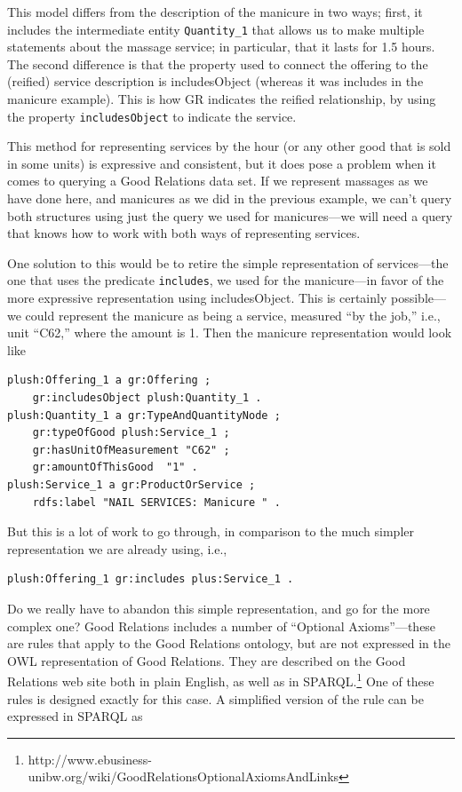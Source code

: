 This model differs from the description of the manicure in two ways;
first, it includes the intermediate entity \texttt{Quantity\_1} that allows us
to make multiple statements about the massage service; in particular,
that it lasts for 1.5 hours. The second difference is that the property
used to connect the offering to the (reified) service description is
includesObject (whereas it was includes in the manicure example). This
is how GR indicates the reified relationship, by using the property
\texttt{includesObject} to indicate the service.

This method for representing services by the hour (or any other good
that is sold in some units) is
expressive and consistent, but it does pose a problem when it comes to
querying a Good Relations data
set. If we represent massages as we have done here, and manicures as we
did in the previous example, we can't query both structures using just
the query we used for manicures---we will need a query that knows how to
work with both ways of representing services.

One solution to this would be to retire the simple representation of
services---the one that uses the predicate \texttt{includes},  we used for
the manicure---in favor of the more expressive representation using
includesObject. This is certainly possible---we could represent the
manicure as being a service, measured ``by the job,'' i.e., unit
``C62,'' where the amount is 1. Then the manicure representation would
look like

\begin{lstlisting}
plush:Offering_1 a gr:Offering ;
    gr:includesObject plush:Quantity_1 .
plush:Quantity_1 a gr:TypeAndQuantityNode ;
    gr:typeOfGood plush:Service_1 ;
    gr:hasUnitOfMeasurement "C62" ;
    gr:amountOfThisGood  "1" .
plush:Service_1 a gr:ProductOrService ;
    rdfs:label "NAIL SERVICES: Manicure " .
\end{lstlisting}

But this is a lot of work to go through, in comparison to the much
simpler representation we are already using, i.e.,

\begin{lstlisting}
plush:Offering_1 gr:includes plus:Service_1 .
\end{lstlisting}

Do we really have to abandon this simple representation, and go for the
more complex one? Good Relations includes a number of ``Optional
Axioms''---these are rules that apply to the
Good Relations ontology, but are not expressed in the OWL representation
of Good Relations. They are described on the Good Relations web site
both in plain English, as well as in SPARQL.\footnote{http://www.ebusiness-unibw.org/wiki/GoodRelationsOptionalAxiomsAndLinks} One of these rules is
designed exactly for this case. A simplified version of the rule can be
expressed in SPARQL as

